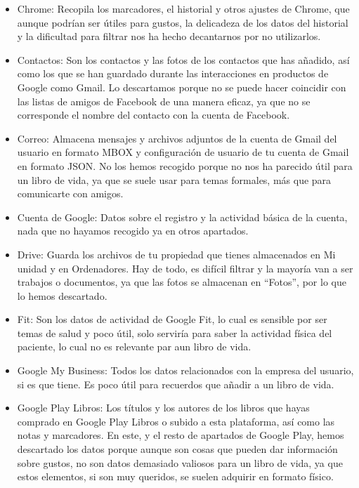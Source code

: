 \begin{itemize}
	\item Chrome: Recopila los marcadores, el historial y otros ajustes de Chrome, que aunque podrían ser útiles para gustos, la delicadeza de los datos del historial y la dificultad para filtrar nos ha hecho decantarnos por no utilizarlos.
	
	\item Contactos: Son los contactos y las fotos de los contactos que has añadido, así como los que se han guardado durante las interacciones en productos de Google como Gmail. Lo descartamos porque no se puede hacer coincidir con las listas de amigos de Facebook de una manera eficaz, ya que no se corresponde el nombre del contacto con la cuenta de Facebook.
	
	\item Correo: Almacena mensajes y archivos adjuntos de la cuenta de Gmail del usuario en formato MBOX y configuración de usuario de tu cuenta de Gmail en formato JSON. No los hemos recogido porque no nos ha parecido útil para un libro de vida, ya que se suele usar para temas formales, más que para comunicarte con amigos.
	
	\item Cuenta de Google: Datos sobre el registro y la actividad básica de la cuenta, nada que no hayamos recogido ya en otros apartados.
	
	\item Drive: Guarda los archivos de tu propiedad que tienes almacenados en Mi unidad y en Ordenadores. Hay de todo, es difícil filtrar y la mayoría van a ser trabajos o documentos, ya que las fotos se almacenan en ``Fotos'', por lo que lo hemos descartado.
	
	\item Fit: Son los datos de actividad de Google Fit, lo cual es sensible por ser temas de salud y poco útil, solo serviría para saber la actividad física del paciente, lo cual no es relevante par aun libro de vida.
	
	\item Google My Business: Todos los datos relacionados con la empresa del usuario, si es que tiene. Es poco útil para recuerdos que añadir a un libro de vida.
	
	\item Google Play Libros: Los títulos y los autores de los libros que hayas comprado en Google Play Libros o subido a esta plataforma, así como las notas y marcadores. En este, y el resto de apartados de Google Play, hemos descartado los datos porque aunque son cosas que pueden dar información sobre gustos, no son datos demasiado valiosos para un libro de vida, ya que estos elementos, si son muy queridos, se suelen adquirir en formato físico.
	

\end{itemize}
